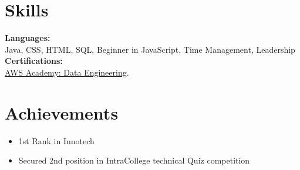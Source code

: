 \documentclass[a4paper,8pt]{article}
\begin{document}
\section{Skills}
\color[HTML]{1C033C}\textbf{Languages:} \\[2pt]
\color[HTML]{371e77} \hspace*{4ex} Java, CSS, HTML, SQL, Beginner in JavaScript, Time Management, Leadership\\[3pt]
\color[HTML]{1C033C}\textbf{Certifications:} \\[2pt]
\color[HTML]{371e77} \hspace*{4ex} \uline{\href{https://www.credly.com/badges/6499ec54-53ca-4bc1-904e-1c46c00a2079/print}{AWS Academy: Data Engineering}}.


\section{Achievements}
\begin{minipage}[t]{\linewidth}
    \begin{itemize}[nosep,after=\strut, leftmargin=2em, itemsep=2pt]
        \item 1st Rank in Innotech
        \item Secured 2nd position in IntraCollege technical Quiz competition
    \end{itemize}
    \end{minipage}
\end{document}
